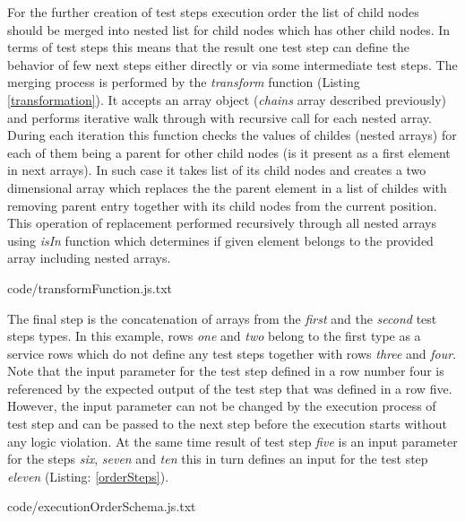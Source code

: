 For the further creation of test steps execution order the list of child nodes should be merged into nested list for child nodes which has other child nodes. In terms of test steps this means that the result one test step can define the behavior of few next steps either directly or via some intermediate test steps. 
The merging process is performed by the \textit{transform} function (Listing \ref{transformation}). It accepts an array object (\textit{chains} array described previously) and performs iterative walk through with recursive call for each nested array. During each iteration this function checks the values of childes (nested arrays) for each of them being a parent for other child nodes (is it present as a first element in next arrays). In such case it takes list of its child nodes and creates a two dimensional array which replaces the the parent element in a list of childes with removing parent entry together with its child nodes from the current position. This operation of replacement performed recursively through all nested arrays using \textit{isIn} function which determines if given element belongs to the provided array including nested arrays.


{code/transformFunction.js.txt}

The final step is the  concatenation of arrays from the \textit{first} and the \textit{second} test steps types. In this example, rows \textit{one} and \textit{two} belong to the first type as a service rows which do not define any test steps together with rows \textit{three} and \textit{four}. Note that the input parameter for the test step defined in a row number four is referenced by the expected output of the test step that was defined in a row five. However, the input parameter can not be changed by the execution process of test step and can be passed to the next step before the execution starts without any logic violation. At the same time result of test step \textit{five} is an input parameter for the steps \textit{six}, \textit{seven} and \textit{ten} this in turn defines an input for the test step \textit{eleven} (Listing: \ref{orderSteps}).

{code/executionOrderSchema.js.txt}


